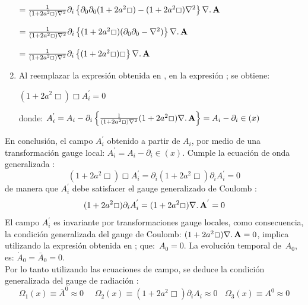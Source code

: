 \documentclass[a4paper,12pt]{article}
\begin{document}
\begin{enumerate}
$=\frac{1}{(1+2a^2\Box)\nabla^2}\partial_{i}\left\{\partial_{0}\partial_{0}(1+2a^2\Box)-(1+2a^2\Box)\nabla^2\right\}\nabla\ldotp {\bf A}$
\vspace{0,1cm}

$=\frac{1}{(1+2a^2\Box)\nabla^2}\partial_{i}\left\{(1+2a^2\Box)(\partial_{0}\partial_{0}-\nabla^2)\right\}\nabla\ldotp {\bf A}$
\vspace{0,1cm}

$=\frac{1}{(1+2a^2\Box)\nabla^2}\partial_{i}\left\{(1+2a^2\Box)\Box\right\}\nabla\ldotp {\bf A}$
\item [\fbox{4.}] Al reemplazar la expresión obtenida en , en la expresión ; se obtiene:
\vspace{0,1cm}

$(1+2a^2\Box)\Box A^{'}_i=0$
\vspace{0,1cm}

donde: $A^{'}_i=A_i-\partial_{i}\left\{\frac{1}{(1+2a^2\Box)\nabla^2}(1+2a^2\Box)\nabla\ldotp {\bf A}\right\}=A_i-\partial_{i}\in(x)$
\end{enumerate}
En conclusión, el campo $A^{'}_i$ obtenido a partir de $A_i$, por medio de una transformación gauge local: $A^{'}_i=A_i-\partial_{i}\in(x)$.
Cumple la ecuación de onda generalizada \cite{podolsky}:
\begin{equation}
(1+2a^2\Box)\Box A^{'}_i=\partial_{i}(1+2a^2\Box)\partial_{i}A^{'}_{i}=0 
\end{equation}
de manera que $A^{'}_i$ debe satisfacer el gauge generalizado de Coulomb \cite{podolsky}:
\begin{equation}
(1+2a^2\Box)\partial_{i}A^{'}_{i}=(1+2a^2\Box)\nabla\ldotp {\bf A}^{'}=0 
\end{equation}
El campo $A^{'}_{i}$ es invariante por transformaciones gauge locales, como consecuencia, la condición generalizada del gauge de Coulomb: \mbox{$(1+2a^2\Box)\nabla\ldotp {\bf A}=0$}, implica utilizando la expresión obtenida en ; \mbox{que: $A_0=0$.} La evolución temporal \mbox{de $A_0$,} es: $\dot A_0={\bar A_0}=0$.     
\\

Por lo tanto utilizando las ecuaciones de campo, se deduce la condición generalizada del gauge de radiación \cite{podolsky}: 
\begin{equation}
\Omega_1(x)\equiv\bar{A}^0\approx0 \ \  \ \ \ \ \Omega_2(x)\equiv (1+2a^2\Box)\partial_i A_i\approx0  \ \  \ \ \Omega_3(x)\equiv A^0\approx0 
\end{equation}
\vspace{0,4cm}
\end{document}
